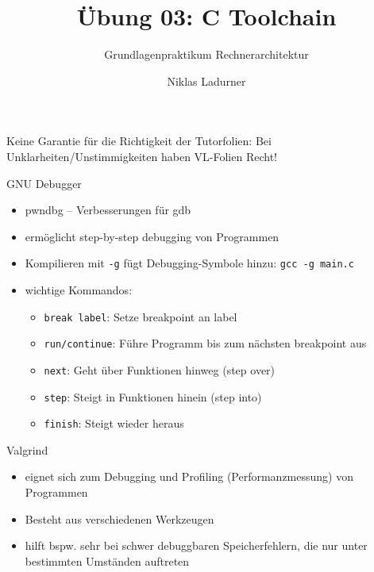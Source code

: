 \documentclass[
  german,            %
  aspectratio=169,    %
]{tumbeamer}
\title{Übung 03: C Toolchain}
\subtitle{Grundlagenpraktikum Rechnerarchitektur}
\author{Niklas Ladurner}
\institute{\theChairName\\\theDepartmentName\\\theUniversityName}
\date{\DTMdisplaydate{2024}{5}{3}{-1}}
\begin{document}
\maketitle

\begin{frame}[c]{}{}
  \begin{center}
    \LARGE  Keine Garantie für die Richtigkeit der Tutorfolien: Bei Unklarheiten/Unstimmigkeiten
    haben VL-Folien Recht!
  \end{center}
\end{frame}



\begin{frame}[c, fragile]{GNU Debugger}{}
  \begin{itemize}
    \item pwndbg -- Verbesserungen für gdb
    \item ermöglicht step-by-step debugging von Programmen
    \item Kompilieren mit \verb|-g| fügt Debugging-Symbole hinzu: \verb|gcc -g main.c|
    \item wichtige Kommandos:
    \begin{itemize}
      \item \verb|break label|: Setze breakpoint an label
      \item \verb|run/continue|: Führe Programm bis zum nächsten breakpoint aus
      \item \verb|next|: Geht über Funktionen hinweg (step over)
      \item \verb|step|: Steigt in Funktionen hinein (step into)
      \item \verb|finish|: Steigt wieder heraus
    \end{itemize}
  \end{itemize}
\end{frame}

\begin{frame}[c, fragile]{Valgrind}{}
  \begin{itemize}
    \item eignet sich zum Debugging und Profiling (Performanzmessung) von Programmen
    \item Besteht aus verschiedenen Werkzeugen
    \item hilft bspw. sehr bei schwer debuggbaren Speicherfehlern, die nur unter bestimmten 
    Umständen auftreten
  \end{itemize}
\end{frame}
\end{document}
